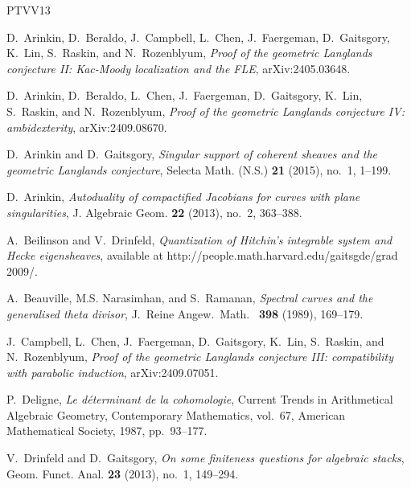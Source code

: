 \documentclass[11pt,oneside,a4paper,mathscr]{amsart}
\theoremstyle{definition}
\begin{document}
\newcommand{\etalchar}[1]{$^{#1}$}
\providecommand{\bysame}{\leavevmode\hbox to3em{\hrulefill}\thinspace}
\providecommand{\MR}{\relax\ifhmode\unskip\space\fi MR }
\providecommand{\MRhref}[2]{%
  \href{http://www.ams.org/mathscinet-getitem?mr=#1}{#2}
}
\providecommand{\href}[2]{#2}
\begin{thebibliography}{PTVV13}

\bibitem[ABC{\etalchar{+}}a]{GLC2}
D.~Arinkin, D.~Beraldo, J.~Campbell, L.~Chen, J.~Faergeman, D.~Gaitsgory, K.~Lin, S.~Raskin, and N.~Rozenblyum, \emph{Proof of the geometric {L}anglands conjecture {II}: {K}ac-{M}oody localization and the {FLE}}, arXiv:2405.03648.

\bibitem[ABC{\etalchar{+}}b]{GLC4}
D.~Arinkin, D.~Beraldo, L.~Chen, J.~Faergeman, D.~Gaitsgory, K.~Lin, S.~Raskin, and N.~Rozenblyum, \emph{Proof of the geometric {L}anglands conjecture {IV}: ambidexterity}, arXiv:2409.08670.

D.~Arinkin and D.~Gaitsgory, \emph{Singular support of coherent sheaves and the geometric {L}anglands conjecture}, Selecta Math. (N.S.) \textbf{21} (2015), no.~1, 1--199.

D.~Arinkin, \emph{Autoduality of compactified {J}acobians for curves with plane singularities}, J. Algebraic Geom. \textbf{22} (2013), no.~2, 363--388.

A.~Beilinson and V.~Drinfeld, \emph{Quantization of {H}itchin's integrable system and {H}ecke eigensheaves}, available at http://people.math.harvard.edu/gaitsgde/grad 2009/.

A.~Beauville, M.S. Narasimhan, and S.~Ramanan, \emph{Spectral curves and the generalised theta divisor}, J.~Reine Angew.~Math.~ \textbf{398} (1989), 169--179.

\bibitem[CCF{\etalchar{+}}]{GLC3}
J.~Campbell, L.~Chen, J.~Faergeman, D.~Gaitsgory, K.~Lin, S.~Raskin, and N.~Rozenblyum, \emph{Proof of the geometric {L}anglands conjecture {III}: compatibility with parabolic induction}, arXiv:2409.07051.

P.~Deligne, \emph{Le d\'eterminant de la cohomologie}, Current Trends in Arithmetical Algebraic Geometry, Contemporary Mathematics, vol.~67, American Mathematical Society, 1987, pp.~93--177.

V.~Drinfeld and D.~Gaitsgory, \emph{On some finiteness questions for algebraic stacks}, Geom. Funct. Anal. \textbf{23} (2013), no.~1, 149--294.


\end{thebibliography}
\end{document}
